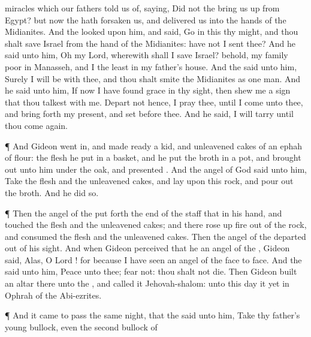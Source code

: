 {miracles which our
fathers
told us of,
saying, Did not the
{} bring us
up from
Egypt? but now the
{} hath
forsaken us, and
delivered us into the
hands of the
Midianites.
And the
{}
looked upon him, and
said,
Go in this thy
might, and thou shalt
save
Israel from the
hand of the
Midianites: have not I
sent thee?
And he
said unto him,
Oh my
Lord,
wherewith shall I
save
Israel? behold, my
family
{}
poor in
Manasseh, and I
{} the
least in my
father’s
house.
And the
{}
said unto him, Surely I will be with thee, and thou shalt
smite the
Midianites as
one
man.
And he
said unto him, If now I have
found
grace in thy
sight, then
shew me a
sign that thou
talkest with me.
Depart not hence, I pray thee, until I
come unto thee, and bring
forth my
present, and
set
{}
before thee. And he
said, I will
tarry until thou come
again.
\par }{\PP {}¶ And
Gideon went
in, and made
ready a
kid, and unleavened
cakes of an
ephah of
flour: the
flesh he
put in a
basket, and he
put the
broth in a
pot, and brought
{}
out unto him under the
oak, and
presented
{}.
And the
angel of
God
said unto him,
Take the
flesh and the unleavened
cakes, and
lay
{} upon
this
rock, and pour
out the
broth. And he
did so.
\par }{\PP {}¶ Then the
angel of the
{} put
forth the
end of the
staff that
{} in his
hand, and
touched the
flesh and the unleavened
cakes; and there rose
up
fire out of the
rock, and
consumed the
flesh and the unleavened
cakes. Then the
angel of the
{}
departed out of his
sight.
And when
Gideon
perceived that he
{} an
angel of the
{},
Gideon
said,
Alas, O
Lord
{}! for
because I have
seen an
angel of the
{}
face to
face.
And the
{}
said unto him,
Peace
{} unto thee;
fear not: thou shalt not
die.
Then
Gideon
built an
altar there unto the
{}, and
called it
Jehovah-shalom: unto this
day it
{} yet in
Ophrah of the
Abi-ezrites.
\par }{\PP {}¶ And it came to pass the same
night, that the
{}
said unto him,
Take thy
father’s
young
bullock, even the
second
bullock of
}

